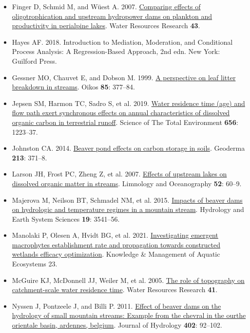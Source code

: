 \documentclass[11pt,a4paper]{article}
\begin{document}
\begin{itemize}
\item[] Finger D, Schmid M, and Wüest A. 2007. \href{https://doi.org/10.1029/2007WR005868}{Comparing effects of oligotrophication and upstream hydropower dams on plankton and productivity in perialpine lakes}. Water Resources Research \textbf{43}.
\item[] Hayes AF. 2018. Introduction to Mediation, Moderation, and Conditional Process Analysis: A Regression-Based Approach, 2nd edn. New York: Guilford Press.
\item[] Gessner MO, Chauvet E, and Dobson M. 1999. \href{https://doi.org/10.2307/3546505}{A perspective on leaf litter breakdown in streams}. Oikos \textbf{85}: 377--84.
\item[] Jepsen SM, Harmon TC, Sadro S, et al. 2019. \href{https://doi.org/10.1016/j.scitotenv.2018.11.392}{Water residence time (age) and flow path exert synchronous effects on annual characteristics of dissolved organic carbon in terrestrial runoff}. Science of The Total Environment \textbf{656}: 1223--37.
\item[] Johnston CA. 2014. \href{https://doi.org/10.1016/j.geoderma.2013.08.025}{Beaver pond effects on carbon storage in soils}. Geoderma \textbf{213}: 371--8.
\item[] Larson JH, Frost PC, Zheng Z, et al. 2007. \href{https://doi.org/10.4319/lo.2007.52.1.0060}{Effects of upstream lakes on dissolved organic matter in streams}. Limnology and Oceanography \textbf{52}: 60--9.
\item[] Majerova M, Neilson BT, Schmadel NM, et al. 2015. \href{https://doi.org/10.5194/hess-19-3541-2015}{Impacts of beaver dams on hydrologic and temperature regimes in a mountain stream}. Hydrology and Earth System Sciences \textbf{19}: 3541--56.
\item[] Manolaki P, Olesen A, Hvidt BG, et al. 2021. \href{https://doi.org/10.1051/kmae/2021020}{Investigating emergent macrophytes establishment rate and propagation towards constructed wetlands efficacy optimization}. Knowledge \& Management of Aquatic Ecosystems 23.
\item[] McGuire KJ, McDonnell JJ, Weiler M, et al. 2005. \href{https://doi.org/10.1029/2004WR003657}{The role of topography on catchment-scale water residence time}. Water Resources Research \textbf{41}.
\item[] Nyssen J, Pontzeele J, and Billi P. 2011. \href{https://doi.org/10.1016/j.jhydrol.2011.03.008}{Effect of beaver dams on the hydrology of small mountain streams: Example from the chevral in the ourthe orientale basin, ardennes, belgium}. Journal of Hydrology \textbf{402}: 92--102.

\end{itemize}
\end{document}

